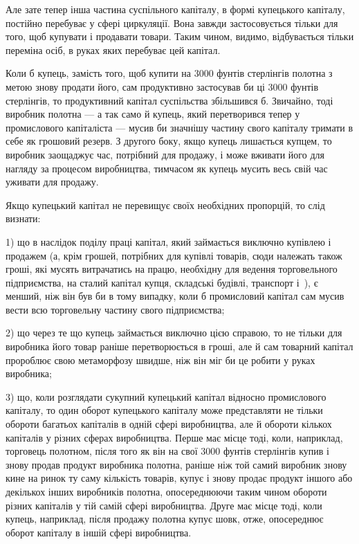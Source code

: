 Але зате тепер інша частина суспільного капіталу, в формі
купецького капіталу, постійно перебуває у сфері циркуляції.
Вона завжди застосовується тільки для того, щоб купувати
і продавати товари. Таким чином, видимо, відбувається тільки
переміна осіб, в руках яких перебуває цей капітал.

Коли б купець, замість того, щоб купити на 3000 фунтів
стерлінгів полотна з метою знову продати його, сам продуктивно
застосував би ці 3000 фунтів стерлінгів, то продуктивний капітал
суспільства збільшився б. Звичайно, тоді виробник полотна —
а так само й купець, який перетворився тепер у промислового
капіталіста — мусив би значнішу частину свого капіталу тримати
в себе як грошовий резерв. З другого боку, якщо купець
лишається купцем, то виробник заощаджує час, потрібний
для продажу, і може вживати його для нагляду за процесом
виробництва, тимчасом як купець мусить весь свій час уживати
для продажу.

Якщо купецький капітал не перевищує своїх необхідних пропорцій,
то слід визнати:

1) що в наслідок поділу праці капітал, який займається виключно
купівлею і продажем (а, крім грошей, потрібних для
купівлі товарів, сюди належать також гроші, які мусять витрачатись
на працю, необхідну для ведення торговельного підприємства,
на сталий капітал купця, складські будівлі, транспорт
і~), є менший, ніж він був би в тому випадку, коли б промисловий
капітал сам мусив вести всю торговельну частину
свого підприємства;

2) що через те що купець займається виключно цією справою,
то не тільки для виробника його товар раніше перетворюється
в гроші, але й сам товарний капітал пророблює свою
метаморфозу швидше, ніж він міг би це робити у руках виробника;

3) що, коли розглядати сукупний купецький капітал відносно
промислового капіталу, то один оборот купецького капіталу
може представляти не тільки обороти багатьох капіталів в одній
сфері виробництва, але й обороти кількох капіталів у різних
сферах виробництва. Перше має місце тоді, коли, наприклад,
торговець полотном, після того як він на свої 3000 фунтів
стерлінгів купив і знову продав продукт виробника полотна,
раніше ніж той самий виробник знову кине на ринок ту саму
кількість товарів, купує і знову продає продукт іншого або декількох
інших виробників полотна, опосереднюючи таким чином
обороти різних капіталів у тій самій сфері виробництва. Друге
має місце тоді, коли купець, наприклад, після продажу полотна
купує шовк, отже, опосереднює оборот капіталу в іншій сфері
виробництва.

